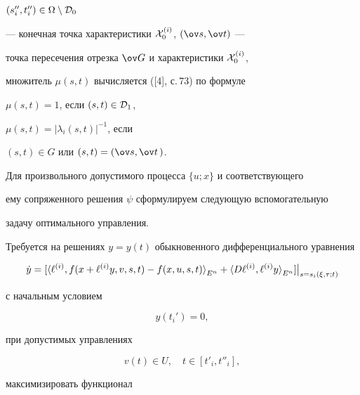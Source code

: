 $(s''_i,t''_i) \in \Omega \setminus {\cal D}_0$


--- конечная точка характеристики ${\cal X}_{0}^{(i)}$, $(\ov s, \ov t)$ ---


точка пересечения отрезка $\ov G$ и характеристики ${\cal X}_{0}^{(i)}$,


множитель $\mu (s,t)$ вычисляется ([4], с.\,73) по формуле


$\mu (s,t) = 1$, если $(s,t) \in {\cal D}_1$,


$\mu (s,t) = {| \lambda_i (s,t) |}^{-1}$, если


$(s,t) \in G$ или $(s,t) = (\ov s, \ov t\,)$.





Для произвольного допустимого процесса $ \{ u; x \}$ и соответствующего


ему сопряженного решения $\psi$ сформулируем следующую вспомогательную


задачу оптимального управления.





Требуется на решениях $y = y(t)$ обыкновенного дифференциального уравнения


\begin{equation}


\Dot y = [ {\la \ell^{(i)}, f(x + \ell^{(i)}y, v,s,t)


-f(x,u,s,t)\ra}_{E^n} +


{\la D \ell^{(i)}, \ell^{(i)}y \ra}_{E^n} ]


\big|_{s = s_{i}(\xi, \tau; t)} 


\end{equation}


с начальным условием


\begin{equation}


y(t_{i}') = 0,


\end{equation}


при допустимых управлениях


\begin{equation}


v(t) \in U, \quad t \in [t'_i, t''_i],


\end{equation}


максимизировать функционал


